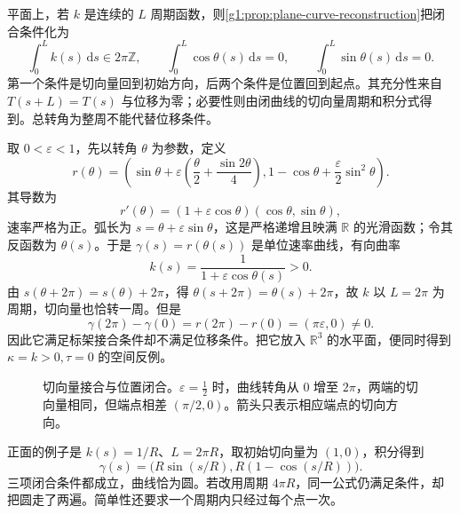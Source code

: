 \ProseParagraphBreak

平面上，若 \(k\) 是连续的 \(L\) 周期函数，则\cref{g1:prop:plane-curve-reconstruction}把闭合条件化为
\begin{equation}
	\label{g1:eq:plane-closure-conditions}
	\int_0^L k(s)\,\mathrm{d}s\in2\pi\mathbb Z,\qquad
	\int_0^L \cos\theta(s)\,\mathrm{d}s=0,\qquad
	\int_0^L \sin\theta(s)\,\mathrm{d}s=0.
\end{equation}
第一个条件是切向量回到初始方向，后两个条件是位置回到起点。其充分性来自 \(T(s+L)=T(s)\) 与位移为零；必要性则由闭曲线的切向量周期和积分式得到。总转角为整周不能代替位移条件。

\begin{example}
	\label{g1:exm:turning-with-displacement}
	取 \(0<\varepsilon<1\)，先以转角 \(\theta\) 为参数，定义
	\[
		r(\theta)=\left(
			\sin\theta+\varepsilon\left(\frac{\theta}{2}+\frac{\sin2\theta}{4}\right),
			1-\cos\theta+\frac{\varepsilon}{2}\sin^2\theta
		\right).
	\]
	其导数为
	\[
		r'(\theta)=(1+\varepsilon\cos\theta)(\cos\theta,\sin\theta),
	\]
	速率严格为正。弧长为 \(s=\theta+\varepsilon\sin\theta\)，这是严格递增且映满 \(\mathbb R\) 的光滑函数；令其反函数为 \(\theta(s)\)。于是 \(\gamma(s)=r(\theta(s))\) 是单位速率曲线，有向曲率
	\[
		k(s)=\frac{1}{1+\varepsilon\cos\theta(s)}>0.
	\]
	由 \(s(\theta+2\pi)=s(\theta)+2\pi\)，得 \(\theta(s+2\pi)=\theta(s)+2\pi\)，故 \(k\) 以 \(L=2\pi\) 为周期，切向量也恰转一周。但是
	\[
		\gamma(2\pi)-\gamma(0)=r(2\pi)-r(0)=(\pi\varepsilon,0)\ne0.
	\]
	因此它满足标架接合条件却不满足位移条件。把它放入 \(\mathbb R^3\) 的水平面，便同时得到 \(\kappa=k>0,\tau=0\) 的空间反例。
\end{example}

\begin{figure}[htbp]
	\centering
	
	\caption[切向量接合与位置闭合]{切向量接合与位置闭合。\(\varepsilon=\tfrac12\) 时，曲线转角从 \(0\) 增至 \(2\pi\)，两端的切向量相同，但端点相差 \((\pi/2,0)\)。箭头只表示相应端点的切向方向。}
	\label{g1:fig:closure-displacement}
\end{figure}

正面的例子是 \(k(s)=1/R\)、\(L=2\pi R\)，取初始切向量为 \((1,0)\)，积分得到
\[
	\gamma(s)=\bigl(R\sin(s/R),R(1-\cos(s/R))\bigr).
\]
三项闭合条件都成立，曲线恰为圆。若改用周期 \(4\pi R\)，同一公式仍满足条件，却把圆走了两遍。简单性还要求一个周期内只经过每个点一次。
